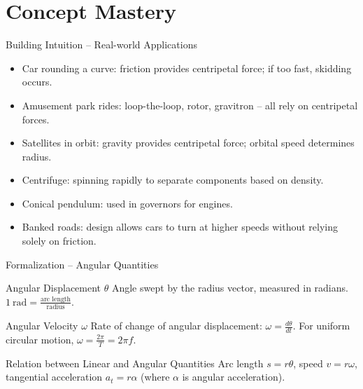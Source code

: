 \documentclass[11pt]{beamer}
\begin{document}
\section{Concept Mastery}

\begin{frame}{Building Intuition – Real-world Applications}
\begin{itemize}
    \item \alert{Car rounding a curve}: friction provides centripetal force; if too fast, skidding occurs.
    \item \alert{Amusement park rides}: loop-the-loop, rotor, gravitron – all rely on centripetal forces.
    \item \alert{Satellites in orbit}: gravity provides centripetal force; orbital speed determines radius.
    \item \alert{Centrifuge}: spinning rapidly to separate components based on density.
    \item \alert{Conical pendulum}: used in governors for engines.
    \item \alert{Banked roads}: design allows cars to turn at higher speeds without relying solely on friction.
\end{itemize}
\end{frame}

\begin{frame}{Formalization – Angular Quantities}
\begin{block}{Angular Displacement $\theta$}
Angle swept by the radius vector, measured in radians. $1\ \text{rad} = \frac{\text{arc length}}{\text{radius}}$.
\end{block}
\begin{block}{Angular Velocity $\omega$}
Rate of change of angular displacement: $\omega = \frac{d\theta}{dt}$. For uniform circular motion, $\omega = \frac{2\pi}{T} = 2\pi f$.
\end{block}
\begin{block}{Relation between Linear and Angular Quantities}
Arc length $s = r\theta$, speed $v = r\omega$, tangential acceleration $a_t = r\alpha$ (where $\alpha$ is angular acceleration).
\end{block}
\end{frame}
\end{document}
